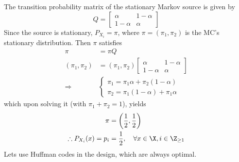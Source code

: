 \documentclass[
  coursecode={MTHE 474},
  assignmentname={Homework \homeworknumber},
  studentnumber=20053722,
  name={Bryan Hoang},
  draft,
]{
  ltxanswer%
}
\begin{document}
  \begin{questions}
    \setcounter{question}{\questionnumber}
    \addtocounter{question}{-1}
    \question[15]\
    \begin{parts}
      \part{}
      \begin{solution}
        The transition probability matrix of the stationary Markov source is given by
        \begin{equation*}
          Q = \begin{bmatrix}
            \alpha   & 1-\alpha \\
            1-\alpha & \alpha
          \end{bmatrix}
        \end{equation*}
        Since the source is stationary, \(P_{X_{i}}=\pi\), where \(\pi=(\pi_{1},\pi_{2})\) is the MC's stationary distribution. Then \(\pi\) satisfies
        \begin{align*}
          \pi               &= \pi Q                                      \\
          (\pi_{1},\pi_{2}) &= (\pi_{1},\pi_{2}) \begin{bmatrix}
                                                   \alpha   & 1-\alpha \\
                                                   1-\alpha & \alpha
                                                 \end{bmatrix}        \\
          \Rightarrow       &\begin{cases}
                               \pi_{1} = \pi_{1}\alpha + \pi_{2} (1-\alpha) \\
                               \pi_{2} = \pi_{1}(1-\alpha) + \pi_{1}\alpha
                             \end{cases}
        \end{align*}
        which upon solving it (with \(\pi_{1}+\pi_{2}=1\)), yields
        \begin{align*}
          \pi                             &= \biggl(\frac{1}{2},\frac{1}{2}\biggr)            \\
          \therefore P_{X_{i}}(x) = p_{i} &= \frac{1}{2}, \quad \forall x\in\X, i\in\Z_{\ge1}
        \end{align*}
        Lets use Huffman codes in the design, which are always optimal.
        \begin{proofpart}

\end{proofpart}
\end{solution}
\end{parts}
\end{questions}
\end{document}
